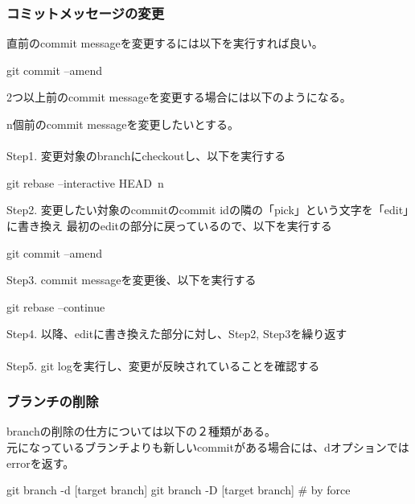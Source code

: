 \documentclass[10pt,a4j,openany,dvipdfmx]{jsarticle}
\begin{document}
\subsubsection{コミットメッセージの変更} %
\label{ssub:コミットメッセージの変更}

直前のcommit messageを変更するには以下を実行すれば良い。
\begin{commandshell}
git commit --amend
\end{commandshell}

2つ以上前のcommit messageを変更する場合には以下のようになる。

\begin{tcolorbox}[skin=enhanced,
left=3mm,right=3mm,top=1mm,bottom=1mm, boxrule=1.0mm, 
title=2つ以上前のcommit messageの変更, coltitle=black, fonttitle=\bfseries, 
colback=SpringGreen!5!white,colframe=SpringGreen!70]
n個前のcommit messageを変更したいとする。\\
\\
Step1. 変更対象のbranchにcheckoutし、以下を実行する
\begin{commandshell}
git rebase --interactive HEAD~n
\end{commandshell}

Step2. 変更したい対象のcommitのcommit idの隣の「pick」という文字を「edit」に書き換え
最初のeditの部分に戻っているので、以下を実行する
\begin{commandshell}
git commit --amend
\end{commandshell}

Step3. commit messageを変更後、以下を実行する
\begin{commandshell}
git rebase --continue
\end{commandshell}

Step4. 以降、editに書き換えた部分に対し、Step2, Step3を繰り返す\\
\\
Step5. git logを実行し、変更が反映されていることを確認する
\end{tcolorbox}


\subsubsection{ブランチの削除} %
\label{ssub:ブランチの削除}

branchの削除の仕方については以下の２種類がある。\\
元になっているブランチよりも新しいcommitがある場合には、dオプションではerrorを返す。
\begin{commandshell}
git branch -d [target branch]
git branch -D [target branch]   # by force
\end{commandshell}





\end{document}
